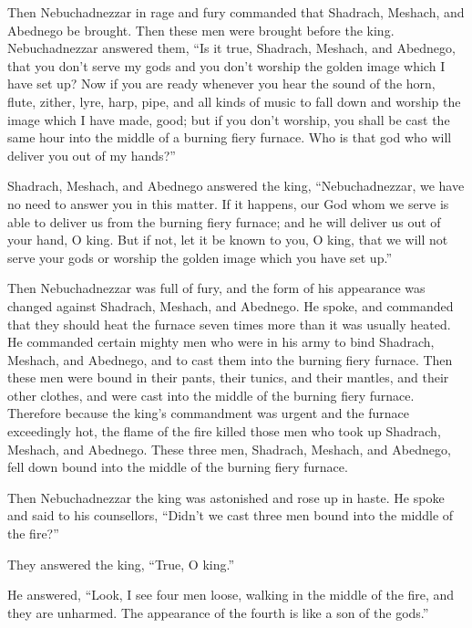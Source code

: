  Then Nebuchadnezzar in rage and fury commanded that
Shadrach, Meshach, and Abednego be brought. Then these men were brought
before the king.  Nebuchadnezzar answered them, ``Is it
true, Shadrach, Meshach, and Abednego, that you don't serve my gods and
you don't worship the golden image which I have set up? 
Now if you are ready whenever you hear the sound of the horn, flute,
zither, lyre, harp, pipe, and all kinds of music to fall down and
worship the image which I have made, good; but if you don't worship, you
shall be cast the same hour into the middle of a burning fiery furnace.
Who is that god who will deliver you out of my hands?''

 Shadrach, Meshach, and Abednego answered the king,
``Nebuchadnezzar, we have no need to answer you in this matter.
 If it happens, our God whom we serve is able to deliver
us from the burning fiery furnace; and he will deliver us out of your
hand, O king.  But if not, let it be known to you, O
king, that we will not serve your gods or worship the golden image which
you have set up.''

 Then Nebuchadnezzar was full of fury, and the form of
his appearance was changed against Shadrach, Meshach, and Abednego. He
spoke, and commanded that they should heat the furnace seven times more
than it was usually heated.  He commanded certain mighty
men who were in his army to bind Shadrach, Meshach, and Abednego, and to
cast them into the burning fiery furnace.  Then these men
were bound in their pants, their tunics, and their mantles, and their
other clothes, and were cast into the middle of the burning fiery
furnace.  Therefore because the king's commandment was
urgent and the furnace exceedingly hot, the flame of the fire killed
those men who took up Shadrach, Meshach, and Abednego. 
These three men, Shadrach, Meshach, and Abednego, fell down bound into
the middle of the burning fiery furnace.

 Then Nebuchadnezzar the king was astonished and rose up
in haste. He spoke and said to his counsellors, ``Didn't we cast three
men bound into the middle of the fire?''

They answered the king, ``True, O king.''

 He answered, ``Look, I see four men loose, walking in
the middle of the fire, and they are unharmed. The appearance of the
fourth is like a son of the gods.''

